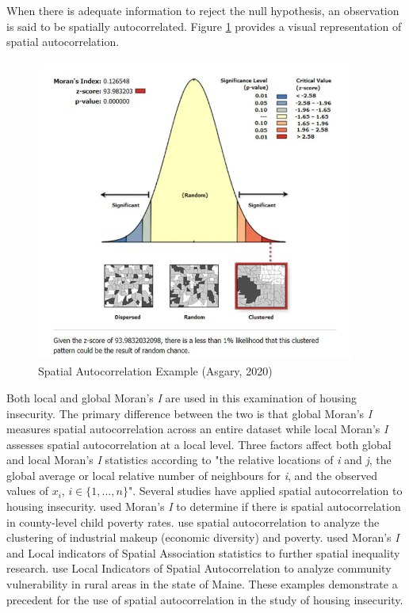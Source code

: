  
When there is adequate information to reject the null hypothesis, an observation is said to be spatially autocorrelated. Figure \ref{fig:moran_ch2} provides a visual representation of spatial autocorrelation.\textcolor{white}{\citep{asgary_what_2020}}

\begin{figure}[htbp]
    \centering
    \includegraphics[width=\textwidth, height=10cm]{plots/moran_ch2.png}
    \caption[Spatial Autocorrelation Example]{Spatial Autocorrelation Example (Asgary, 2020)}
    \label{fig:moran_ch2}
\end{figure}

\pagebreak

Both local and global Moran's \textit{I} are used in this examination of housing insecurity. The primary difference between the two is that global Moran's \textit{I} measures spatial autocorrelation across an entire dataset while local Moran's \textit{I} assesses spatial autocorrelation at a local level. Three factors affect both global and local Moran's \textit{I} statistics according to \citet[320]{boots_global_2000} "the relative locations of \textit{i} and \textit{j}, the global average or local relative number of neighbours for \textit{i}, and the observed values of $x_i$, {$i \in \{1, \ldots, n\}$}". Several studies have applied spatial autocorrelation to housing insecurity. \citet{voss_county_2006} used Moran's \textit{I} to determine if there is spatial autocorrelation in county-level child poverty rates. \citet{curtis_spatial_2019} use spatial autocorrelation to analyze the clustering of industrial makeup (economic diversity) and poverty. \citet{brooks_advantages_2019} used Moran’s \textit{I} and Local indicators of Spatial Association statistics to further spatial inequality research. \citet{gleason_using_2021} use Local Indicators of Spatial Autocorrelation to analyze community vulnerability in rural areas in the state of Maine. These examples demonstrate a precedent for the use of spatial autocorrelation in the study of housing insecurity. 

